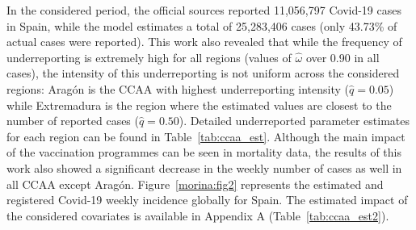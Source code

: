 \documentclass{article}
\begin{document}
In the considered period, the official sources reported 11,056,797 Covid-19 cases in Spain, while the model estimates a total of 25,283,406 cases (only 43.73\% of actual cases were reported). This work also revealed that while the frequency of underreporting is extremely high for all regions (values of $\hat{\omega}$ over 0.90 in all cases), the intensity of this underreporting is not uniform across the considered regions: Arag\'on is the CCAA with highest underreporting intensity ($\hat{q}=0.05$) while Extremadura is the region where the estimated values are closest to the number of reported cases ($\hat{q}=0.50$). Detailed underreported parameter estimates for each region can be found in Table~\ref{tab:ccaa_est}. Although the main impact of the vaccination programmes can be seen in mortality data, the results of this work also showed a significant decrease in the weekly number of cases as well in all CCAA except Arag\'on. Figure~\ref{morina:fig2} represents the estimated and registered Covid-19 weekly incidence globally for Spain. The estimated impact of the considered covariates is available in Appendix A (Table~\ref{tab:ccaa_est2}).
\end{document}
